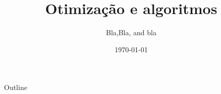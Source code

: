 \documentclass{beamer}					%
\title{Otimização e algoritmos}	%
\author{Bla,Bla, and bla}	%
\institute{IST}					%
\date{\today}									%
\begin{document}
\begin{frame}
  \titlepage
\end{frame}

\begin{frame}{Outline}
  \tableofcontents
\end{frame}

%
\end{document}
